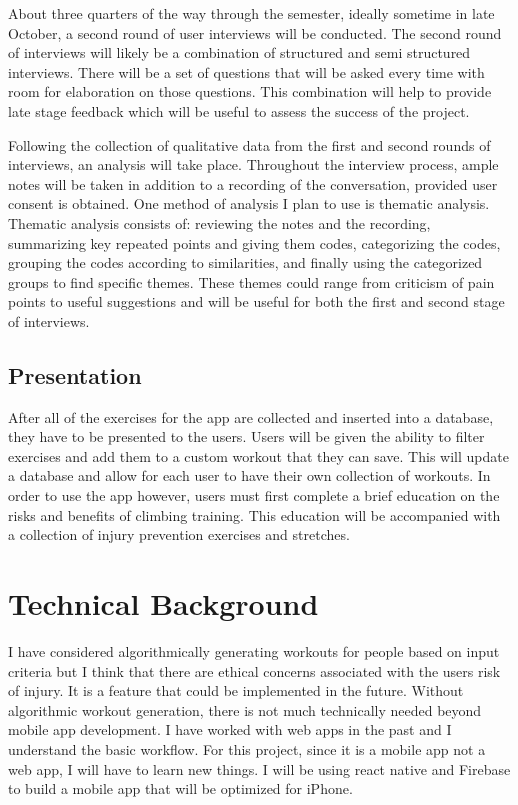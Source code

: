\documentclass[10pt,twocolumn]{article}
\begin{document}
    About three quarters of the way through the semester, ideally sometime in late October, a second round of user interviews will be conducted. The second round of interviews will likely be a combination of structured and semi structured interviews. There will be a set of questions that will be asked every time with room for elaboration on those questions. This combination will help to provide late stage feedback which will be useful to assess the success of the project. \cite{christian_user_2021}
    
    Following the collection of qualitative data from the first and second rounds of interviews, an analysis will take place. Throughout the interview process, ample notes will be taken in addition to a recording of the conversation, provided user consent is obtained. One method of analysis I plan to use is thematic analysis. Thematic analysis consists of: reviewing the notes and the recording, summarizing key repeated points and giving them codes, categorizing the codes, grouping the codes according to similarities, and finally using the categorized groups to find specific themes. These themes could range from criticism of pain points to useful suggestions and will be useful for both the first and second stage of interviews. \cite{christian_user_2021}
    
\subsection{Presentation}
    
    After all of the exercises for the app are collected and inserted into a database, they have to be presented to the users. Users will be given the ability to filter exercises and add them to a custom workout that they can save. This will update a database and allow for each user to have their own collection of workouts. In order to use the app however, users must first complete a brief education on the risks and benefits of climbing training. This education will be accompanied with a collection of injury prevention exercises and stretches.  
	
\section{Technical Background}

    I have considered algorithmically generating workouts for people based on input criteria but I think that there are ethical concerns associated with the users risk of injury. It is a feature that could be implemented in the future. Without algorithmic workout generation, there is not much technically needed beyond mobile app development. I have worked with web apps in the past and I understand the basic workflow. For this project, since it is a mobile app not a web app, I will have to learn new things. I will be using react native and Firebase to build a mobile app that will be optimized for iPhone.
\end{document}

